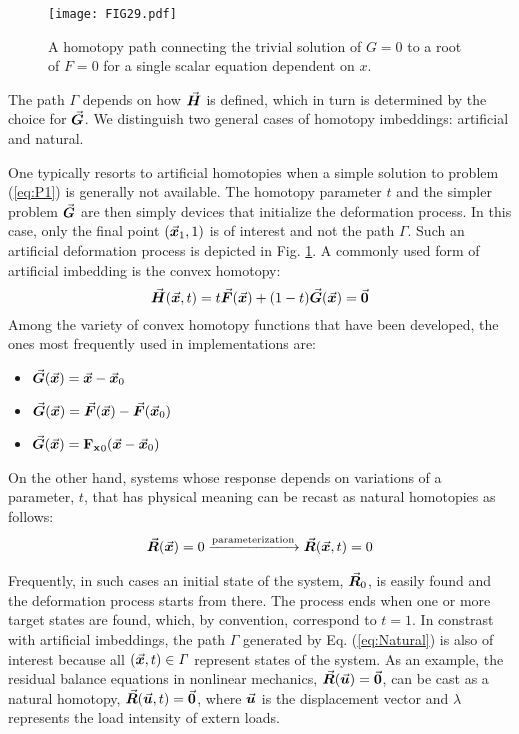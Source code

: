 \begin{figure}[t]
	\centering
	\texttt{[image: FIG29.pdf]}
	\caption{A homotopy path connecting the trivial solution of $G=0$ 
		to a root of $F=0$ for a single scalar equation dependent on $x$.}
	\label{fig:FIG29}
\end{figure}
The path $\mathit{\Gamma}$ depends on how $\vec{\bm{H}}$ is defined, which in turn 
is determined by the choice for $\vec{\bm{G}}$. We distinguish two general
cases of homotopy imbeddings: artificial and natural.

One typically resorts to artificial homotopies when a simple solution to problem
(\ref{eq:P1}) is generally not available. The homotopy parameter
$t$ and the simpler problem $\vec{\bm{G}}$ are then simply devices that
initialize the deformation process. In this
case, only the final point $(\vec{\bm{x}}_1,1)$ is of interest and not the path
$\mathit{\Gamma}$. Such an artificial deformation process is depicted in Fig. 
\ref{fig:FIG29}. A commonly used form
of artificial imbedding is the convex homotopy: 
\begin{equation}
	\vec{\bm{H}}(\vec{\bm{x}},t) = t\vec{\bm{F}}(\vec{\bm{x}})+(1-t)\vec{\bm{G}}(\vec{\bm{x}})=\vec{\bm{0}}
	\label{eq:homotopy1}
\end{equation}
Among the variety of convex homotopy functions that have been
developed, the ones most frequently used in implementations are:
\begin{itemize}
	\item{
		$\vec{\bm{G}}(\vec{\bm{x}})=\vec{\bm{x}}-\vec{\bm{x}}_0$}
	\cite{Chow:1978,Watson:2002}
	\item{ $\vec{\bm{G}}(\vec{\bm{x}}) =
		\vec{\bm{F}}(\vec{\bm{x}})-\vec{\bm{F}}(\vec{\bm{x}}_0)$}
	\cite{Keller:1978,Smale:1976}
	\item{ $\vec{\bm{G}}(\vec{\bm{x}}) =
		\mathbf{F_x}_0(\vec{\bm{x}}-\vec{\bm{x}}_0)$}\ \cite{Garcia:1980,Wayburn:1987}
\end{itemize}
On the other hand, systems whose response depends on
variations of a parameter, $t$, that has physical meaning can be recast as 
natural homotopies as follows:
\begin{gather}
	\vec{\bm{R}}(\vec{\bm{x}})=0 \xrightarrow{\text{parameterization}} 
	\vec{\bm{R}}(\vec{\bm{x}},t)=0
	\label{eq:Natural}
\end{gather}

Frequently, in such cases an initial state of the system, $\vec{\bm{R}}_0$, is
easily found and the deformation process starts from there. The
process ends when one or more target states are found, which, by convention, 
correspond to $t=1$. In constrast with artificial imbeddings, the path
$\mathit{\Gamma}$ generated by Eq. (\ref{eq:Natural}) is also of interest
because all $(\vec{\bm{x}},t)\in\mathit{\Gamma}$ represent states of the
system. As an example, the residual balance equations in nonlinear mechanics, 
$\vec{\bm{R}}(\vec{\bm{u}})=\vec{\bm{0}}$, can be cast as a natural homotopy,
$\vec{\bm{R}}(\vec{\bm{u}},t)=\vec{\bm{0}}$, where $\vec{\bm{u}}$ is the displacement vector 
and $\lambda$ represents the load intensity of extern loads.

